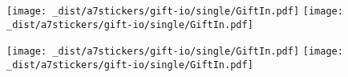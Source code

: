 


\texttt{[image: \_dist/a7stickers/gift-io/single/GiftIn.pdf]}%
\texttt{[image: \_dist/a7stickers/gift-io/single/GiftIn.pdf]}%

\texttt{[image: \_dist/a7stickers/gift-io/single/GiftIn.pdf]}%
\texttt{[image: \_dist/a7stickers/gift-io/single/GiftIn.pdf]}%


